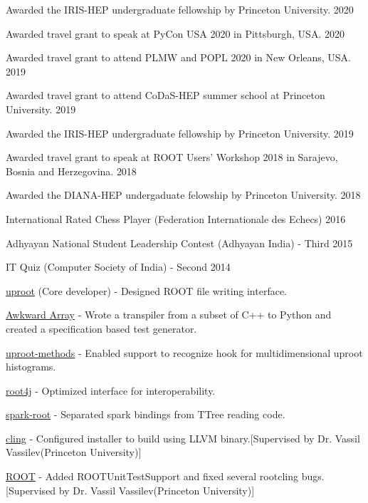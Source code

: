 \documentclass[10pt, letterpaper]{fulldeps}
\begin{document}
%
%
\begin{tightitemize}
\item Awarded the IRIS-HEP undergraduate fellowship by Princeton University. \hfill{2020}
    \item Awarded travel grant to speak at PyCon USA 2020 in Pittsburgh, USA. \hfill{2020}
    \item Awarded travel grant to attend PLMW and POPL 2020 in New Orleans, USA. \hfill{2019}
    \item Awarded travel grant to attend CoDaS-HEP summer school at Princeton University. \hfill{2019}
    \item Awarded the IRIS-HEP undergraduate fellowship by Princeton University. \hfill{2019}
    \item Awarded travel grant to speak at ROOT Users' Workshop 2018 in Sarajevo, Bosnia and Herzegovina. \hfill{2018}
	\item Awarded the DIANA-HEP undergaduate felowship by Princeton University. \hfill{2018}
\end{tightitemize}

\begin{tightitemize}
    \item International Rated Chess Player (Federation Internationale des Echecs) \hfill{2016}
    \item Adhyayan National Student Leadership Contest (Adhyayan India) - Third \hfill{2015}
    \item IT Quiz (Computer Society of India) - Second \hfill{2014}
\end{tightitemize}

\begin{tightitemize}
\item {\href{https://github.com/scikit-hep/uproot}{uproot}} (Core developer) - Designed ROOT file writing interface.
\item {\href{https://github.com/scikit-hep/awkward-1.0}{Awkward Array}} - Wrote a transpiler from a subset of C++ to Python and created a specification based test generator.
\item {\href{https://github.com/scikit-hep/uproot-methods}{uproot-methods}} - Enabled support to recognize hook for multidimensional uproot histograms.
\item {\href{https://github.com/diana-hep/root4j}{root4j}} - Optimized interface for interoperability.
\item {\href{https://github.com/diana-hep/spark-root}{spark-root}} - Separated spark bindings from TTree reading code.
\item {\href{https://github.com/root-project/cling}{cling}} - Configured installer to build using LLVM binary.[Supervised by Dr. Vassil Vassilev(Princeton University)]
\item {\href{https://github.com/root-project/root}{ROOT}} - Added ROOTUnitTestSupport and fixed several rootcling bugs.[Supervised by Dr. Vassil Vassilev(Princeton University)]
\end{tightitemize}
\end{document}
